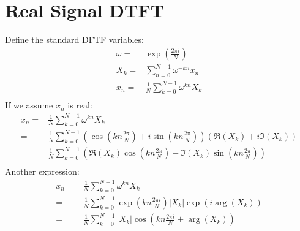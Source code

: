 
\section{Real Signal DTFT}
Define the standard DFTF variables:
\begin{equation*}
\begin{aligned}
	\omega =& \exp\left(\frac{2\pi i}{N}\right)\\
	X_k =& \sum_{n=0}^{N-1}\omega^{-kn}x_n\\
	x_n =& \frac{1}{N} \sum_{k=0}^{N-1}\omega^{kn}X_k\\
\end{aligned}
\end{equation*}
If we assume $x_n$ is real:
\begin{equation*}
\begin{aligned}
	x_n =& \frac{1}{N} \sum_{k=0}^{N-1}\omega^{kn}X_k\\
	=& \frac{1}{N} \sum_{k=0}^{N-1}\left(\cos\left(kn\frac{2\pi}{N}\right)+i\sin\left(kn\frac{2\pi}{N}\right)\right)\left(\Re(X_k)+i\Im(X_k)\right)\\
	=& \frac{1}{N} \sum_{k=0}^{N-1}\left(\Re(X_k)\cos\left(kn\frac{2\pi}{N}\right)-\Im(X_k)\sin\left(kn\frac{2\pi}{N}\right)\right)\\
\end{aligned}
\end{equation*}
Another expression:
\begin{equation*}
\begin{aligned}
	x_n =& \frac{1}{N} \sum_{k=0}^{N-1}\omega^{kn}X_k\\
	=& \frac{1}{N} \sum_{k=0}^{N-1}\exp\left(kn\frac{2\pi i}{N}\right)|X_k|\exp(i\arg(X_k))\\
	=& \frac{1}{N} \sum_{k=0}^{N-1}|X_k|\cos\left(kn\frac{2\pi i}{N}+\arg(X_k)\right)\\
\end{aligned}
\end{equation*}
